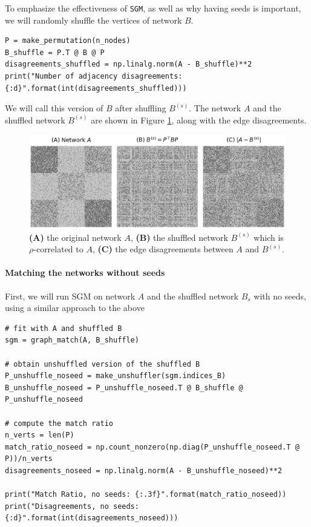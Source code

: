 To emphasize the effectiveness of \texttt{SGM}, as well as why having seeds is important, we will randomly shuffle the vertices of network $B$. 

\begin{lstlisting}[style=python]
P = make_permutation(n_nodes)
B_shuffle = P.T @ B @ P
disagreements_shuffled = np.linalg.norm(A - B_shuffle)**2
print("Number of adjacency disagreements: {:d}".format(int(disagreements_shuffled)))
\end{lstlisting}

We will call this version of $B$ after shuffling $B^{(s)}$. The network $A$ and the shuffled network $B^{(s)}$ are shown in Figure \ref{fig:ch8:gm:sgm:ex}, along with the edge disagreements.

\begin{figure}[h]
    \centering
    \includegraphics[width=\linewidth]{applications/ch8/Images/gm_seed_ex.png}
    \caption[Seeded graph matching example]{\textbf{(A)} the original network $A$, \textbf{(B)} the shuffled network $B^{(s)}$ which is $\rho$-correlated to $A$, \textbf{(C)} the edge disagreements between $A$ and $B^{(s)}$.}
    \label{fig:ch8:gm:sgm:ex}
\end{figure}

\paragraph*{Matching the networks without seeds}

First, we will run SGM on network $A$ and the shuffled network $B_s$ with no seeds, using a similar approach to the above


\begin{lstlisting}[style=python]
# fit with A and shuffled B
sgm = graph_match(A, B_shuffle)

# obtain unshuffled version of the shuffled B
P_unshuffle_noseed = make_unshuffler(sgm.indices_B)
B_unshuffle_noseed = P_unshuffle_noseed.T @ B_shuffle @ P_unshuffle_noseed

# compute the match ratio
n_verts = len(P)
match_ratio_noseed = np.count_nonzero(np.diag(P_unshuffle_noseed.T @ P))/n_verts
disagreements_noseed = np.linalg.norm(A - B_unshuffle_noseed)**2

print("Match Ratio, no seeds: {:.3f}".format(match_ratio_noseed))
print("Disagreements, no seeds: {:d}".format(int(disagreements_noseed)))
\end{lstlisting}

